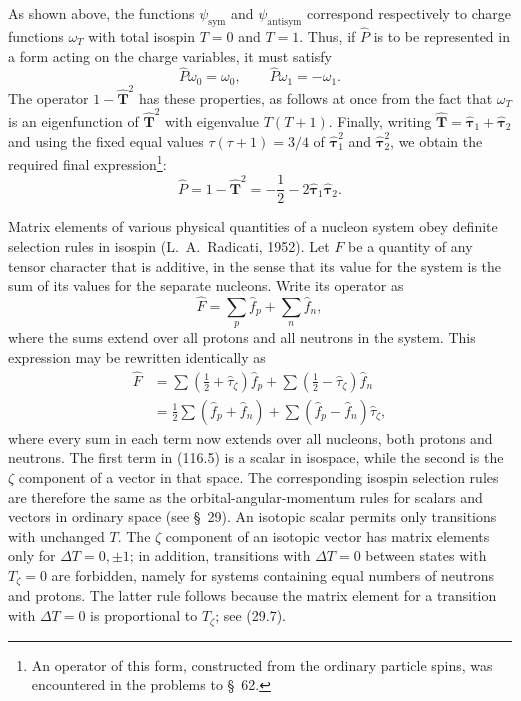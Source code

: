 As shown above, the functions $\psi_{\mathrm{sym}}$ and $\psi_{\mathrm{antisym}}$ correspond respectively to charge functions $\omega_T$ with total isospin $T=0$ and $T=1$. Thus, if $\hat P$ is to be represented in a form acting on the charge variables, it must satisfy
\begin{equation}
 \hat P\omega_0=\omega_0,\qquad \hat P\omega_1=-\omega_1.
 \tag{116.3}
\end{equation}
The operator $1-\hat{\mathbf T}^2$ has these properties, as follows at once from the fact that $\omega_T$ is an eigenfunction of $\hat{\mathbf T}^2$ with eigenvalue $T(T+1)$. Finally, writing $\hat{\mathbf T}=\hat{\boldsymbol\tau}_1+\hat{\boldsymbol\tau}_2$ and using the fixed equal values $\tau(\tau+1)=3/4$ of $\hat{\boldsymbol\tau}_1^2$ and $\hat{\boldsymbol\tau}_2^2$, we obtain the required final expression\footnote{An operator of this form, constructed from the ordinary particle spins, was encountered in the problems to \S~62.}:
\begin{equation}
 \hat P=1-\hat{\mathbf T}^2=-\frac12
 -2\hat{\boldsymbol\tau}_1\hat{\boldsymbol\tau}_2.
 \tag{116.4}
\end{equation}

Matrix elements of various physical quantities of a nucleon system obey definite selection rules in isospin (L.~A.~Radicati, 1952). Let $F$ be a quantity of any tensor character that is additive, in the sense that its value for the system is the sum of its values for the separate nucleons. Write its operator as
\[
 \hat F=\sum_p\hat f_p+\sum_n\hat f_n,
\]
where the sums extend over all protons and all neutrons in the system. This expression may be rewritten identically as
\begin{equation}
 \begin{split}
 \hat F&=\sum\left(\frac12+\hat\tau_\zeta\right)\hat f_p
 +\sum\left(\frac12-\hat\tau_\zeta\right)\hat f_n\\
 &=\frac12\sum(\hat f_p+\hat f_n)
 +\sum(\hat f_p-\hat f_n)\hat\tau_\zeta,
 \end{split}
 \tag{116.5}
\end{equation}
where every sum in each term now extends over all nucleons, both protons and neutrons. The first term in (116.5) is a scalar in isospace, while the second is the $\zeta$ component of a vector in that space. The corresponding isospin selection rules are therefore the same as the orbital-angular-momentum rules for scalars and vectors in ordinary space (see \S~29). An isotopic scalar permits only transitions with unchanged $T$. The $\zeta$ component of an isotopic vector has matrix elements only for $\Delta T=0,\pm1$; in addition, transitions with $\Delta T=0$ between states with $T_\zeta=0$ are forbidden, namely for systems containing equal numbers of neutrons and protons. The latter rule follows because the matrix element for a transition with $\Delta T=0$ is proportional to $T_\zeta$; see (29.7).

